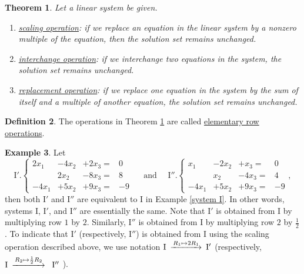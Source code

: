 \documentclass[12pt,letterpaper]{book}
\numberwithin{equation}{section}
\newtheorem{thm}{\textbf{Theorem}}[section]
\theoremstyle{definition}
\newtheorem{defi}[thm]{\textbf{Definition}}
\newtheorem{example}[thm]{\textbf{Example}}
\begin{document}
\begin{thm}\label{elementary row operations} Let a linear system be given.
\begin{enumerate}
\item \underline{scaling operation}: if we replace an equation in the linear system by a nonzero multiple of the equation, then the solution set remains unchanged.
\item \underline{interchange operation}: if we interchange two equations in the system, the solution set remains unchanged.
\item \underline{replacement operation}: if we replace one equation in the system by the sum of itself and a multiple of
another equation, the solution set remains unchanged.
\end{enumerate}
\end{thm}

\begin{defi} The operations in Theorem \ref{elementary row operations} are called
\underline{elementary row operations}.
\end{defi}

\begin{example} Let
$$\text{I$'$.}\left\{\begin{array}{rrrr}
2x_1&-4x_2&+2x_3=&0
\\ &2x_2 &-8x_3=&8 \\ -4x_1&+5x_2&+9x_3=&-9 \end{array}\right. \quad \text{ and }\quad \text{I$''$.}\left\{\begin{array}{rrrr}
x_1&-2x_2&+x_3=&0
\\ &x_2 &-4x_3=&4 \\ -4x_1&+5x_2&+9x_3=&-9 \end{array}\right. , $$
then both I$'$ and I$''$ are equivalent to I in Example \ref{system I}. In other words,
systems I, I$'$, and I$''$ are essentially the same. Note that I$'$ is obtained from I by multiplying row $1$ by $2$. Similarly, I$''$ is obtained from I by multiplying row $2$ by $\frac{1}{2}$. To indicate that I$'$ (respectively, I$''$) is obtained from I using the scaling operation described above, we use notation
$\begin{CD} \text{I} @>R_1\mapsto
2R_1>\quad > \text{I$'$} \end{CD}$ (respectively, $\begin{CD} \text{I} @>R_2\mapsto
\frac{1}{2}R_2>\quad > \text{ I$''$}\end{CD}$ ).
\end{example}
\end{document}
